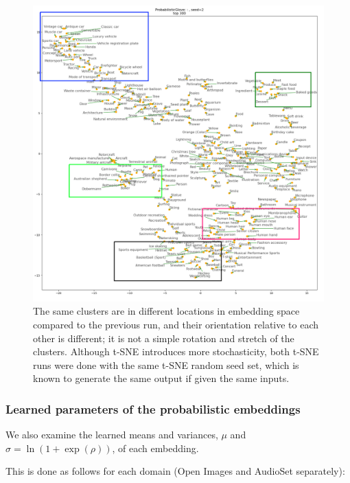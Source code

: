 \begin{figure}[H]
    \centering
    \includegraphics[width=\textwidth]{images/method/probabilistic_independent/top300_tsne_openimages__ProbabilisticGlove_2_clusters.png}
    \caption{
        The same clusters are in different locations in embedding space compared to the previous run, and their orientation relative to each other is different; it is not a simple rotation and stretch of the clusters. Although t-SNE introduces more stochasticity, both t-SNE runs were done with the same t-SNE random seed set, which is known to generate the same output if given the same inputs. 
    }
\end{figure}

\newpage
\subsubsection{Learned parameters of the probabilistic embeddings}

We also examine the learned means and variances, $\mu$ and $\sigma = \ln(1 + \exp(\rho))$, of each embedding. 

This is done as follows for each domain (Open Images and AudioSet separately):

